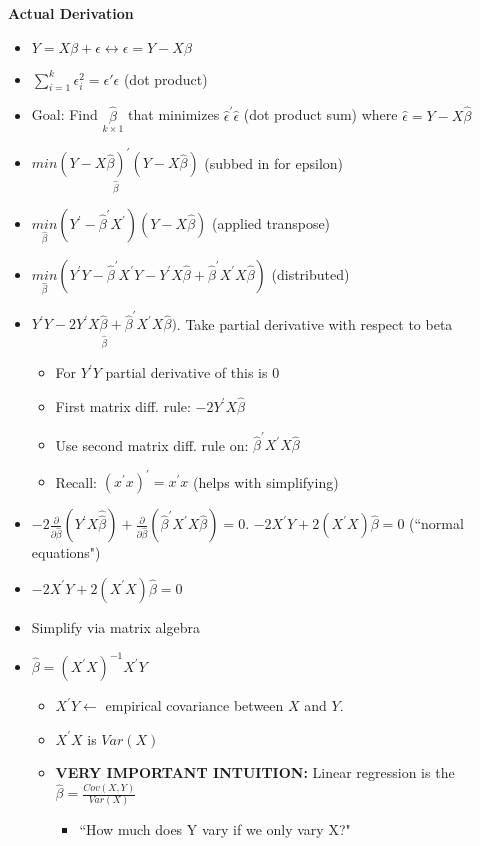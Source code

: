 \documentclass[10pt, oneside]{article}
\begin{document}
\textbf{Actual Derivation}
\begin{itemize}
    \item $Y = X\beta + \epsilon \leftrightarrow \epsilon = Y- X\beta$
    \item $\sum_{i=1}^k \epsilon_i ^2 = \epsilon\prime \epsilon$ (dot product)
    \item Goal: Find $\underset{k\times 1}{\hat \beta}$ that minimizes $\hat \epsilon^\prime \hat \epsilon$ (dot product sum) where $\hat \epsilon = Y - X\hat \beta$
    \item $\underset{\hat \beta}{min(Y-X\hat \beta)^\prime(Y-X\hat \beta)}$ (subbed in for epsilon)
    \item $\underset{\hat \beta}{min} (Y^\prime - \hat \beta ^\prime X^\prime) (Y-X\hat \beta)$ (applied transpose)
    \item $\underset{\hat \beta}{min} (Y^\prime Y - \hat \beta^\prime X^\prime Y - Y^\prime X \hat \beta + \hat \beta^\prime X^\prime X\hat \beta)$ (distributed)
    \item $\underset{\hat \beta}{Y^\prime Y - 2Y^\prime X \hat \beta + \hat \beta^\prime X^\prime X \hat \beta)}$. Take partial derivative with respect to beta
    \begin{itemize}
        \item For $Y^\prime Y$ partial derivative of this is 0
        \item First matrix diff. rule: $-2Y^\prime X \hat \beta$
        \item Use second matrix diff. rule on: $\hat \beta^\prime X^\prime X \hat \beta$
        \item Recall: $(x^\prime x)^\prime = x^\prime x$ (helps with simplifying)
    \end{itemize}
    \item $-2 \frac{\partial}{\partial \hat \beta} (Y^\prime X\hat \hat \beta) + \frac{\partial}{\partial \hat \beta} (\hat \beta^\prime X^\prime X \hat \beta)=0$. $-2 X^\prime Y + 2(X^\prime X)\hat \beta = 0$ (``normal equations")
    \item $-2 X^\prime Y + 2(X^\prime X)\hat \beta = 0$
    \item Simplify via matrix algebra
    \item $\hat \beta = (X^\prime X)^{-1} X^\prime Y$
    \begin{itemize}
        \item $X^\prime Y \leftarrow$ empirical covariance between $X$ and $Y$.
        \item $X^\prime X$ is $Var(X)$
        \item \textbf{VERY IMPORTANT INTUITION: }Linear regression is the $\hat \beta = \frac{Cov(X,Y)}{Var(X)}$
        \begin{itemize}
            \item ``How much does Y vary if we only vary X?"
        \end{itemize}
    \end{itemize}
\end{itemize}
\end{document}
